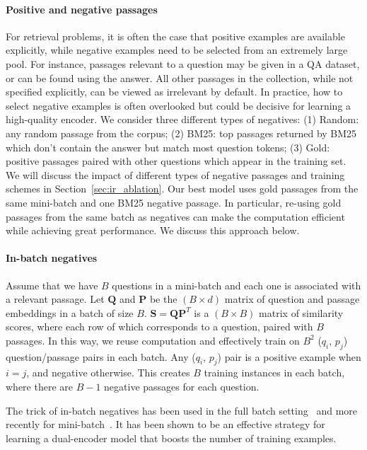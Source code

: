 \paragraph{Positive and negative passages}
For retrieval problems, it is often the case that positive examples are available explicitly, while negative examples need to be selected from an extremely large pool.
For instance, passages relevant to a question may be given in a QA dataset, or can be found using the answer.
All other passages in the collection, while not specified explicitly, can be viewed as irrelevant by default.
In practice, how to select negative examples is often overlooked but could be decisive for learning a high-quality encoder.
We consider three different types of negatives: (1) Random: any random passage from the corpus; (2) BM25: top passages returned by BM25 which don't contain the answer but match most question tokens; (3) Gold: positive passages paired with other questions which appear in the training set. We will discuss the impact of different types of negative passages and training schemes in Section~\ref{sec:ir_ablation}.
Our best model uses gold passages from the same mini-batch and one BM25 negative passage.
In particular, re-using gold passages from the same batch as negatives can make the computation efficient while achieving great performance.
We discuss this approach below.

\paragraph{In-batch negatives}
Assume that we have $B$ questions in a mini-batch and each one is associated with a relevant passage. Let $\mathbf{Q}$ and $\mathbf{P}$ be the $(B\times d)$ matrix of question and passage embeddings in a batch of size $B$.
$\mathbf{S} = \mathbf{Q}\mathbf{P}^T$ is a $(B\times B)$ matrix of similarity scores, where each row of which corresponds to a question, paired with $B$ passages.
In this way, we reuse computation and effectively train on $B^2$ ($q_i$, $p_j$) question/passage pairs in each batch.
Any ($q_i$, $p_j$) pair is a positive example when $i=j$, and negative otherwise.
This creates $B$ training instances in each batch, where there are $B-1$ negative passages for each question.

The trick of in-batch negatives has been used in the full batch setting~\cite{yih2011learning} and more recently
for mini-batch~\cite{henderson2017efficient,gillick-etal-2019-learning}.
It has been shown to be an effective strategy for learning a dual-encoder model %
that boosts the number of training examples.
